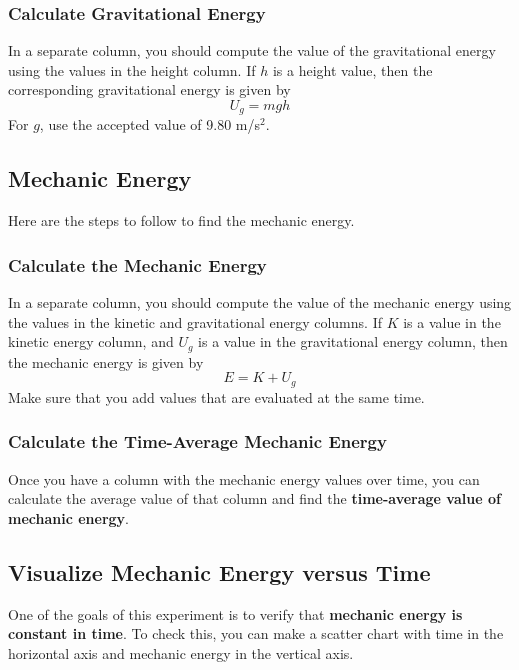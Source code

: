 \subsubsection{Calculate Gravitational Energy}
In a separate column, you should compute the value of the gravitational energy using the values in the height column. If $h$ is a height value, then the corresponding gravitational energy is given by
\begin{equation}
    U_{g} = m g h
\end{equation}
For $g$, use the accepted value of 9.80 m/s$^{2}$.
\subsection{Mechanic Energy}
Here are the steps to follow to find the mechanic energy.
\subsubsection{Calculate the Mechanic Energy}
In a separate column, you should compute the value of the mechanic energy using the values in the kinetic and gravitational energy columns. If $K$ is a value in the kinetic energy column, and $U_{g}$ is a value in the gravitational energy column, then the mechanic energy is given by
\begin{equation}
    E = K + U_{g}
\end{equation}
Make sure that you add values that are evaluated at the same time.
\subsubsection{Calculate the Time-Average Mechanic Energy}
Once you have a column with the mechanic energy values over time, you can calculate the average value of that column and find the \textbf{time-average value of mechanic energy}.
\subsection{Visualize Mechanic Energy versus Time}
One of the goals of this experiment is to verify that \textbf{mechanic energy is constant in time}. To check this, you can make a scatter chart with time in the horizontal axis and mechanic energy in the vertical axis.


